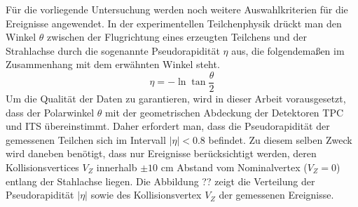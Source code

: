 \documentclass[12pt,a4paper]{report}
\begin{document}
Für die vorliegende Untersuchung werden noch weitere Auswahlkriterien für die Ereignisse angewendet. In der experimentellen Teilchenphysik drückt man den Winkel $\theta$ zwischen der Flugrichtung eines erzeugten Teilchens und der Strahlachse durch die sogenannte Pseudorapidität $\eta$ aus, die folgendemaßen im Zusammenhang mit dem erwähnten Winkel steht.\\
\begin{equation} \label{eq:Eta}
  \eta= -\ln{\tan{\dfrac{\theta}{2}}}
\end{equation}
Um die Qualität der Daten zu garantieren, wird in dieser Arbeit vorausgesetzt, dass der Polarwinkel $\theta$ mit der geometrischen Abdeckung der Detektoren TPC und ITS übereinstimmt. Daher erfordert man, dass die Pseudorapidität der gemessenen Teilchen sich im Intervall $|\eta| < 0.8$ befindet. Zu diesem selben Zweck wird daneben benötigt, dass nur Ereignisse berücksichtigt werden, deren Kollisionsvertices $V_{Z}$ innerhalb $\pm 10$ cm Abstand vom Nominalvertex ($V_{Z} = 0$) entlang der Stahlachse liegen. Die Abbildung ?? zeigt die Verteilung der Pseudorapidität $|\eta|$ sowie des Kollisionsvertex $V_{Z}$ der gemessenen Ereignisse.
\end{document}
